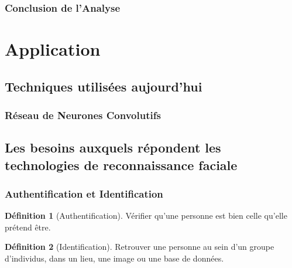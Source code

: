 \documentclass{beamer}
\theoremstyle{plain}
\theoremstyle{definition}
\newtheorem{defi}{Définition}
\begin{document}
\begin{frame}
  \frametitle{Conclusion de l'Analyse}
\end{frame}



\section{Application}
\subsection{Techniques utilisées aujourd'hui}

\begin{frame}
  \frametitle{Réseau de Neurones Convolutifs}


  
\end{frame}


\subsection{Les besoins auxquels répondent les technologies de reconnaissance faciale}
\begin{frame}
  \frametitle{Authentification et Identification}
  \begin{defi}[Authentification]
    Vérifier qu’une personne est bien celle qu’elle prétend être.
  \end{defi}
  
  \pause

  \begin{defi}[Identification]
    Retrouver une personne au sein d’un groupe d’individus, dans un lieu, une image ou une base de données.
  \end{defi}
\end{frame}
\end{document}
